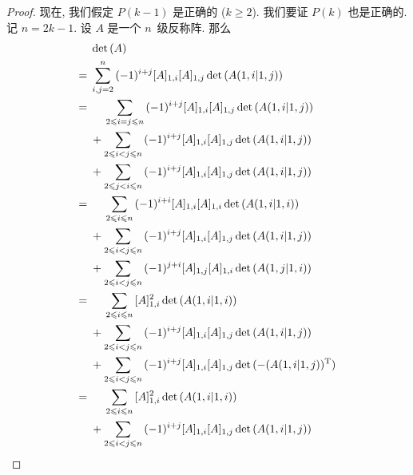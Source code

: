 \begin{proof}
    现在, 我们假定 \(P(k-1)\) 是正确的 (\(k \geq 2\)).
    我们要证 \(P(k)\) 也是正确的.
    记 \(n = 2k-1\).
    设 \(A\) 是一个 \(n\)~级反称阵.
    那么
    \begin{align*}
             & \det {(A)}     \\
        = {} &
        \sum_{i, j = 2}^{n} {
        (-1)^{i+j}
            [A]_{1,i} [A]_{1,j} \det {(A(1,i|1,j))}
        }
        \\
        = {} &
        \hphantom{{} + {}}
        \sum_{2 \leq i = j \leq n} {
            (-1)^{i+j}
                [A]_{1,i} [A]_{1,j} \det {(A(1,i|1,j))}
        }
        \\
             & +
        \sum_{2 \leq i < j \leq n} {
            (-1)^{i+j}
                [A]_{1,i} [A]_{1,j} \det {(A(1,i|1,j))}
        }
        \\
             & +
        \sum_{2 \leq j < i \leq n} {
            (-1)^{i+j}
                [A]_{1,i} [A]_{1,j} \det {(A(1,i|1,j))}
        }
        \\
        = {} &
        \hphantom{{} + {}}
        \sum_{2 \leq i \leq n} {
            (-1)^{i+i}
                [A]_{1,i} [A]_{1,i} \det {(A(1,i|1,i))}
        }
        \\
             & +
        \sum_{2 \leq i < j \leq n} {
            (-1)^{i+j}
                [A]_{1,i} [A]_{1,j} \det {(A(1,i|1,j))}
        }
        \\
             & +
        \sum_{2 \leq i < j \leq n} {
            (-1)^{j+i}
                [A]_{1,j} [A]_{1,i} \det {(A(1,j|1,i))}
        }
        \\
        = {} &
        \hphantom{{} + {}}
        \sum_{2 \leq i \leq n} {
            [A]_{1,i}^2 \det {(A(1,i|1,i))}
        }
        \\
             & +
        \sum_{2 \leq i < j \leq n} {
            (-1)^{i+j}
                [A]_{1,i} [A]_{1,j} \det {(A(1,i|1,j))}
        }
        \\
             & +
        \sum_{2 \leq i < j \leq n} {
            (-1)^{i+j}
                [A]_{1,i} [A]_{1,j}
            \det {(-(A(1,i|1,j))^{\mathrm{T}})}
        }
        \\
        = {} &
        \hphantom{{} + {}}
        \sum_{2 \leq i \leq n} {
            [A]_{1,i}^2 \det {(A(1,i|1,i))}
        }
        \\
             & +
        \sum_{2 \leq i < j \leq n} {
            (-1)^{i+j}
                [A]_{1,i} [A]_{1,j} \det {(A(1,i|1,j))}
        }
        \\

\end{align*}
\end{proof}
